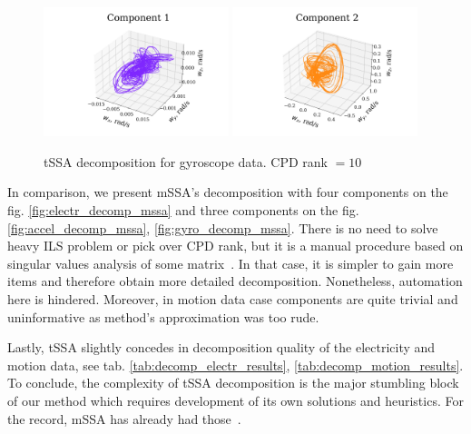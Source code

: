 \documentclass[referee, pdflatex, sn-mathphys-num]{sn-jnl}
\theoremstyle{definition}
\theoremstyle{plain}
\begin{document}
	\begin{figure}[h]
		\centering
		\includegraphics[width=0.48\textwidth, 	keepaspectratio]{gyro_1.png}
		\includegraphics[width=0.48\textwidth, keepaspectratio]{gyro_2.png}
		\caption{tSSA decomposition for gyroscope data. CPD rank $ = 10 $}\label{fig:gyro_decomp_tssa}
	\end{figure}
	
	In comparison, we present mSSA's decomposition with four components on the fig. \ref{fig:electr_decomp_mssa} and three components on the fig. \ref{fig:accel_decomp_mssa}, \ref{fig:gyro_decomp_mssa}. There is no need to solve heavy ILS problem or pick over CPD rank, but it is a manual procedure based on singular values analysis of some matrix~\cite{ecfb9dc578be43ae9ee8fc88b8ff9151}. In that case, it is simpler to gain more items and therefore obtain more detailed decomposition. Nonetheless, automation here is hindered. Moreover, in motion data case components are quite trivial and uninformative as method's approximation was too rude.
	
	Lastly, tSSA slightly concedes in decomposition quality of the electricity and motion data, see tab. \ref{tab:decomp_electr_results}, \ref{tab:decomp_motion_results}. To conclude, the complexity of tSSA decomposition is the major stumbling block of our method which requires development of its own solutions and heuristics. For the record, mSSA has already had those~\cite{ecfb9dc578be43ae9ee8fc88b8ff9151}.
	
\end{document}

